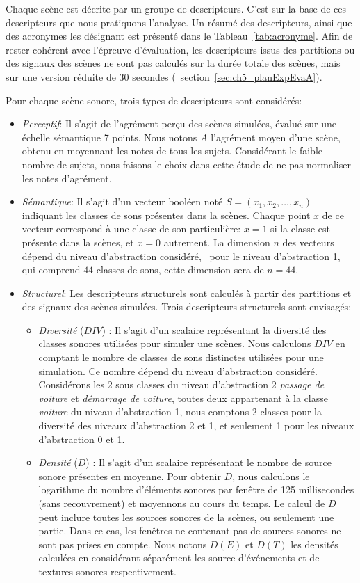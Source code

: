 Chaque scène est décrite par un groupe de descripteurs. C'est sur la base de ces descripteurs que nous pratiquons l'analyse. Un résumé des descripteurs, ainsi que des acronymes les désignant est présenté dans le Tableau~\ref{tab:acronyme}. Afin de rester cohérent avec l'épreuve d'évaluation, les descripteurs issus des partitions ou des signaux des scènes ne sont pas calculés sur la durée totale des scènes, mais sur une version réduite de 30 secondes (\Cf~section~\ref{sec:ch5_planExpEvaA}). 

Pour chaque scène sonore, trois types de descripteurs sont considérés:

\begin{itemize}
\item \emph{Perceptif}: Il s'agit de l'agrément perçu des scènes simulées, évalué sur une échelle sémantique 7 points. Nous notons $A$ l'agrément moyen d'une scène, obtenu en moyennant les notes de tous les sujets. Considérant le faible nombre de sujets, nous faisons le choix dans cette étude de ne pas normaliser les notes d'agrément.
\item \emph{Sémantique}: Il s'agit d'un vecteur booléen noté $S=(x_1,x_2,\ldots,x_n)$ indiquant les classes de sons présentes dans la scènes. Chaque point $x$ de ce vecteur correspond à une classe de son particulière: $x=1$ si la classe est présente dans la scènes, et $x=0$ autrement. La dimension $n$ des vecteurs dépend du niveau d'abstraction considéré, \eg~pour le niveau d'abstraction 1, qui comprend $44$ classes de sons, cette dimension sera de $n=44$.
\item \emph{Structurel}: Les descripteurs structurels sont calculés à partir des partitions et des signaux des scènes simulées. Trois descripteurs structurels sont envisagés:
\begin{itemize}
\item \emph{Diversité} ($DIV$) : Il s'agit d'un scalaire représentant la diversité des classes sonores utilisées pour simuler une scènes. Nous calculons $DIV$ en comptant le nombre de classes de sons distinctes utilisées pour une simulation. Ce nombre dépend du niveau d'abstraction considéré. Considérons les 2 sous classes du niveau d'abstraction 2 \emph{passage de voiture} et \emph{démarrage de voiture}, toutes deux appartenant à la classe \emph{voiture} du niveau d'abstraction 1, nous comptons 2 classes pour la diversité des niveaux d'abstraction 2 et 1, et seulement 1 pour les niveaux d'abstraction 0 et 1.
\item \emph{Densité} ($D$) : Il s'agit d'un scalaire représentant le nombre de source sonore présentes en moyenne. Pour obtenir $D$, nous calculons le logarithme du nombre d'éléments sonores par fenêtre de 125 millisecondes (sans recouvrement) et moyennons au cours du temps. Le calcul de $D$ peut inclure toutes les sources sonores de la scènes, ou seulement une partie. Dans ce cas, les fenêtres ne contenant pas de sources sonores ne sont pas prises en compte. Nous notons $D(E)$ et $D(T)$ les densités calculées en considérant séparément les source d'événements et de textures sonores respectivement.

\end{itemize}
\end{itemize}
